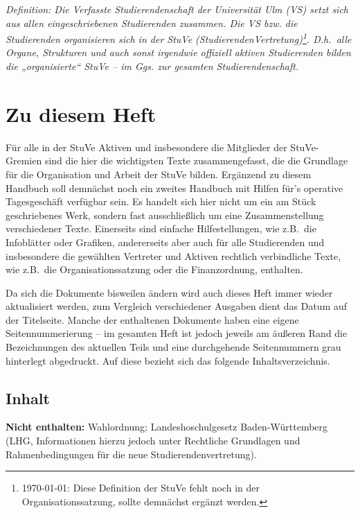 

\textit{Definition: Die Verfasste Studierendenschaft der Universität Ulm (VS) setzt sich aus allen eingeschriebenen Studierenden zusammen.
Die VS bzw. die Studierenden organisieren sich in der StuVe (StudierendenVertretung)\footnote{\today: Diese Definition der StuVe fehlt noch in der Organisationssatzung, sollte demnächst ergänzt werden.}.
D.h.\ alle Organe, Strukturen und auch sonst irgendwie offiziell aktiven Studierenden bilden die „organisierte“ StuVe – im Ggs. zur gesamten Studierendenschaft.}


\section*{Zu diesem Heft}


Für alle in der StuVe Aktiven und insbesondere die Mitglieder der StuVe-Gremien sind die hier die wichtigsten Texte zusammengefasst, die die Grundlage für die Organisation und Arbeit der StuVe bilden. Ergänzend zu diesem Handbuch soll demnächst noch ein zweites Handbuch mit Hilfen für's operative Tagesgeschäft verfügbar sein.
Es handelt sich hier nicht um ein am Stück geschriebenes Werk, sondern fast ausschließlich um eine Zusammenstellung verschiedener Texte.
Einerseits sind einfache Hilfestellungen, wie z.B.\ die Infoblätter oder Grafiken, andererseits aber auch für alle Studierenden und insbesondere die gewählten Vertreter und Aktiven rechtlich verbindliche Texte, wie z.B.\ die Organisationssatzung oder die Finanzordnung, enthalten.

Da sich die Dokumente bisweilen ändern wird auch dieses Heft immer wieder aktualisiert werden, zum Vergleich verschiedener Ausgaben dient das Datum auf der Titelseite.
Manche der enthaltenen Dokumente haben eine eigene Seitennummerierung – im gesamten Heft ist jedoch jeweils am äußeren Rand die Bezeichnungen des aktuellen Teils und eine durchgehende Seitennummern grau hinterlegt abgedruckt. Auf diese bezieht sich das folgende Inhaltsverzeichnis.


\subsection*{Inhalt}


\toccontents

\null
\textbf{Nicht enthalten:} Wahlordnung; Landeshoschulgesetz Baden-Württemberg (LHG, Informationen hierzu jedoch unter Rechtliche Grundlagen und Rahmenbedingungen für die neue Studierendenvertretung).

\clearpage